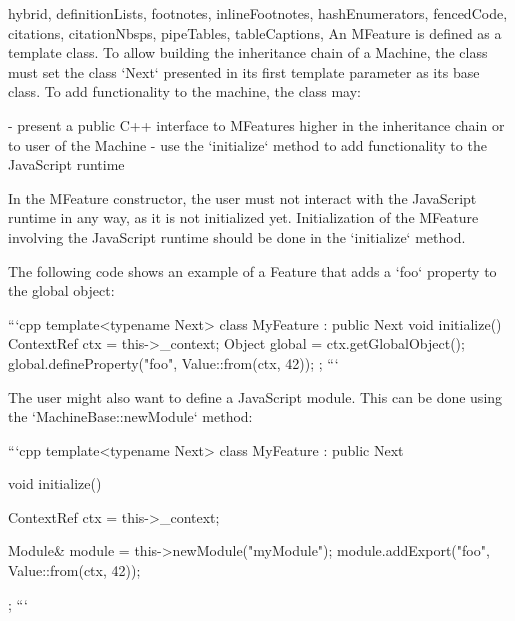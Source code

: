 \begin{markdown*}{%
  hybrid,
  definitionLists,
  footnotes,
  inlineFootnotes,
  hashEnumerators,
  fencedCode,
  citations,
  citationNbsps,
  pipeTables,
  tableCaptions,
}
An MFeature is defined as a template class. To allow building the inheritance chain of a Machine, the class must set the class `Next` presented in its first template parameter as its base class. To add functionality to the machine, the class may:

  - present a public C++ interface to MFeatures higher in the inheritance chain or to user of the Machine
  - use the `initialize` method to add functionality to the JavaScript runtime

In the MFeature constructor, the user must not interact with the JavaScript runtime in any way, as it is not initialized yet. Initialization of the MFeature involving the JavaScript runtime should be done in the `initialize` method.

The following code shows an example of a Feature that adds a `foo` property to the global object:

```cpp
template<typename Next>
class MyFeature : public Next {
    void initialize() {
        ContextRef ctx = this->_context;
        Object global = ctx.getGlobalObject();
        global.defineProperty("foo", Value::from(ctx, 42));
    }
};
```

The user might also want to define a JavaScript module. This can be done using the `MachineBase::newModule` method:

```cpp
template<typename Next>
class MyFeature : public Next {
    void initialize() {
        ContextRef ctx = this->_context;

        Module& module = this->newModule("myModule");
        module.addExport("foo", Value::from(ctx, 42));
    }
};
```


\end{markdown*}
